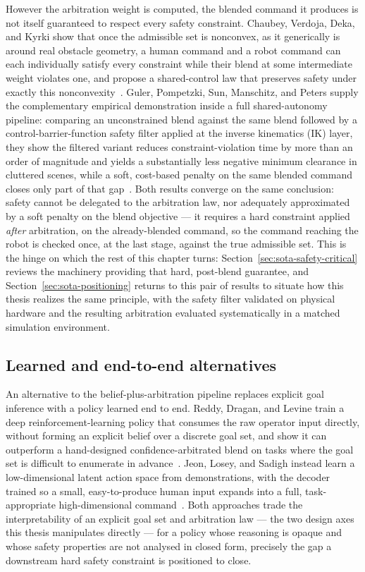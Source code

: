 \label{sec:sota-linear-blending-limits}
However the arbitration weight is computed, the blended command it produces is not itself guaranteed to respect every safety constraint. Chaubey, Verdoja, Deka, and Kyrki show that once the admissible set is nonconvex, as it generically is around real obstacle geometry, a human command and a robot command can each individually satisfy every constraint while their blend at some intermediate weight violates one, and propose a shared-control law that preserves safety under exactly this nonconvexity~\cite{chaubey2026minimalintervention}. Guler, Pompetzki, Sun, Manschitz, and Peters supply the complementary empirical demonstration inside a full shared-autonomy pipeline: comparing an unconstrained blend against the same blend followed by a control-barrier-function safety filter applied at the inverse kinematics (IK) layer, they show the filtered variant reduces constraint-violation time by more than an order of magnitude and yields a substantially less negative minimum clearance in cluttered scenes, while a soft, cost-based penalty on the same blended command closes only part of that gap~\cite{guler2026barrierik}. Both results converge on the same conclusion: safety cannot be delegated to the arbitration law, nor adequately approximated by a soft penalty on the blend objective --- it requires a hard constraint applied \emph{after} arbitration, on the already-blended command, so the command reaching the robot is checked once, at the last stage, against the true admissible set. This is the hinge on which the rest of this chapter turns: Section~\ref{sec:sota-safety-critical} reviews the machinery providing that hard, post-blend guarantee, and Section~\ref{sec:sota-positioning} returns to this pair of results to situate how this thesis realizes the same principle, with the safety filter validated on physical hardware and the resulting arbitration evaluated systematically in a matched simulation environment.

\subsection{Learned and end-to-end alternatives}
\label{sec:sota-learned}

An alternative to the belief-plus-arbitration pipeline replaces explicit goal inference with a policy learned end to end. Reddy, Dragan, and Levine train a deep reinforcement-learning policy that consumes the raw operator input directly, without forming an explicit belief over a discrete goal set, and show it can outperform a hand-designed confidence-arbitrated blend on tasks where the goal set is difficult to enumerate in advance~\cite{reddy2018sharedrl}. Jeon, Losey, and Sadigh instead learn a low-dimensional latent action space from demonstrations, with the decoder trained so a small, easy-to-produce human input expands into a full, task-appropriate high-dimensional command~\cite{jeon2020latentactions}. Both approaches trade the interpretability of an explicit goal set and arbitration law --- the two design axes this thesis manipulates directly --- for a policy whose reasoning is opaque and whose safety properties are not analysed in closed form, precisely the gap a downstream hard safety constraint is positioned to close.

